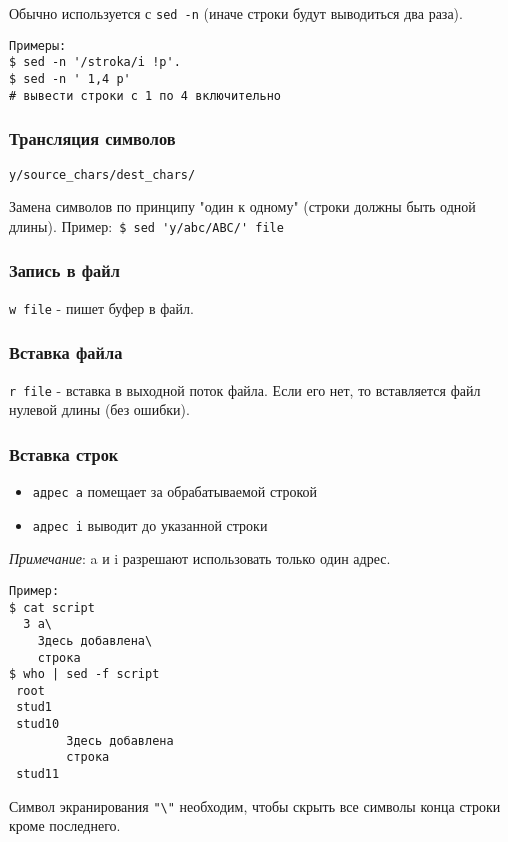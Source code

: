 Обычно используется с \verb+sed -n+ (иначе строки будут выводиться два раза).
\begin{verbatim}
Примеры: 
$ sed -n '/stroka/i !p'.
$ sed -n ' 1,4 p'
# вывести строки с 1 по 4 включительно
\end{verbatim}

\subsubsection{Трансляция символов} 

\verb+y/source_chars/dest_chars/+  

Замена символов по принципу "один к одному" (строки должны быть одной длины).
Пример:\verb+ $ sed 'y/abc/ABC/' file+

\subsubsection{Запись в файл} \verb+w file+ - пишет буфер в файл.

\subsubsection{Вставка файла} \verb+r file+ - вставка в выходной поток файла. Если его нет, то вставляется файл нулевой длины (без ошибки).

\subsubsection{Вставка строк} 
\begin{itemize}
\item \verb+адрес a+  помещает за обрабатываемой строкой
\item \verb+адрес i+  выводит до указанной строки
\end{itemize}

\emph{Примечание}: a и i разрешают использовать только один адрес.
\begin{verbatim}
Пример:
$ cat script
  3 a\
	Здесь добавлена\
	строка
$ who | sed -f script
 root
 stud1
 stud10
        Здесь добавлена
        строка
 stud11
\end{verbatim}                    

Символ экранирования \verb+"\"+ необходим, чтобы скрыть все символы конца строки кроме последнего.

